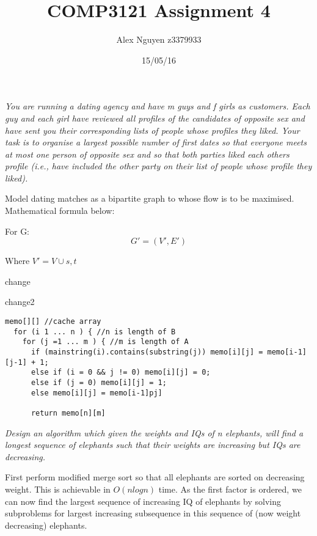\documentclass[11pt, a4paper]{article}
\title{COMP3121 Assignment 4}
\author{Alex Nguyen z3379933}
\date{15/05/16}
\begin{document}


\vspace{2mm}
\textit{You are running a dating agency and have m guys and f girls as customers. Each guy
and each girl have reviewed all profiles of the candidates of opposite sex and have
sent you their corresponding lists of people whose profiles they liked. Your task is to
organise a largest possible number of first dates so that everyone meets at most one
person of opposite sex and so that both parties liked each others profile (i.e., have
included the other party on their list of people whose profile they liked).
}


\vspace{5mm}

Model dating matches as a bipartite graph to whose flow is to be maximised.
Mathematical formula below:

For G:
\[ G' = (V', E')\]

Where $V' = V \cup {s,t}$


change

change2



\begin{lstlisting}[frame=single]
  memo[][] //cache array
  for (i 1 ... n ) { //n is length of B
    for (j =1 ... m ) { //m is length of A
      if (mainstring(i).contains(substring(j)) memo[i][j] = memo[i-1][j-1] + 1;
      else if (i = 0 && j != 0) memo[i][j] = 0;
      else if (j = 0) memo[i][j] = 1;
      else memo[i][j] = memo[i-1]pj]
 
      return memo[n][m]
\end{lstlisting}


\textit{Design an algorithm which given the weights and IQs of n elephants, will find a longest sequence of elephants such that their weights are increasing but IQs are decreasing.}

\vspace{2mm}
First perform modified merge sort so that all elephants are sorted on decreasing weight.
This is achievable in $O(nlog n)$ time.
As the first factor is ordered, we can now find the largest sequence of increasing IQ of elephants by solving subproblems for largest increasing subsequence in this sequence of (now weight decreasing) elephants.
\end{document}
